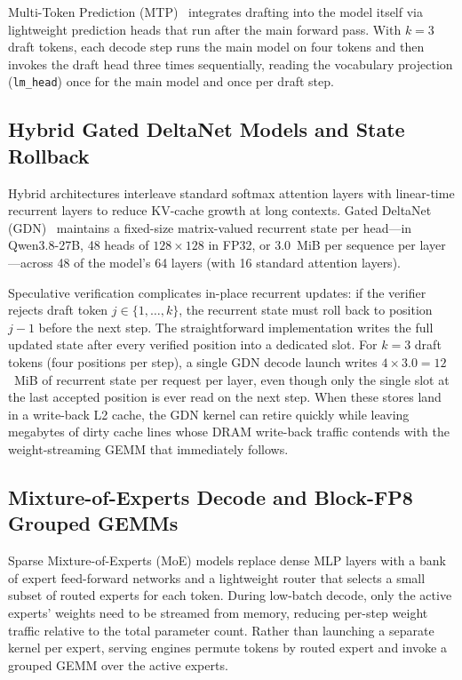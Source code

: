 Multi-Token Prediction (MTP)~\cite{deepseekv3} integrates drafting into the model itself via
lightweight prediction heads that run after the main forward pass.
With $k{=}3$ draft tokens, each decode step runs the main model on four tokens and then
invokes the draft head three times sequentially, reading the vocabulary projection
(\texttt{lm\_head}) once for the main model and once per draft step.

\subsection{Hybrid Gated DeltaNet Models and State Rollback}

Hybrid architectures interleave standard softmax attention layers with linear-time recurrent
layers to reduce KV-cache growth at long contexts.
Gated DeltaNet (GDN)~\cite{yang2025gated} maintains a fixed-size matrix-valued recurrent
state per head---in Qwen3.8-27B, 48 heads of $128 \times 128$ in FP32, or 3.0~MiB per
sequence per layer---across 48 of the model's 64 layers (with 16 standard attention layers).

Speculative verification complicates in-place recurrent updates: if the verifier rejects
draft token $j \in \{1, \dots, k\}$, the recurrent state must roll back to position $j{-}1$
before the next step.
The straightforward implementation writes the full updated state after every verified
position into a dedicated slot.
For $k{=}3$ draft tokens (four positions per step), a single GDN decode launch writes
$4 \times 3.0 = 12$~MiB of recurrent state per request per layer, even though only the
single slot at the last accepted position is ever read on the next step.
When these stores land in a write-back L2 cache, the GDN kernel can retire quickly while
leaving megabytes of dirty cache lines whose DRAM write-back traffic contends with the
weight-streaming GEMM that immediately follows.

\subsection{Mixture-of-Experts Decode and Block-FP8 Grouped GEMMs}

Sparse Mixture-of-Experts (MoE) models replace dense MLP layers with a bank of expert
feed-forward networks and a lightweight router that selects a small subset of routed experts
for each token.
During low-batch decode, only the active experts' weights need to be streamed from memory,
reducing per-step weight traffic relative to the total parameter count.
Rather than launching a separate kernel per expert, serving engines permute tokens by routed
expert and invoke a grouped GEMM over the active experts.

